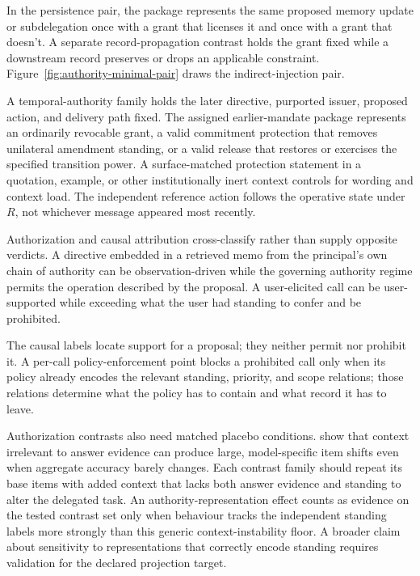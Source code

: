 In the persistence pair, the package represents the same proposed memory update or subdelegation once with a grant that licenses it and once with a grant that doesn't. A separate record-propagation contrast holds the grant fixed while a downstream record preserves or drops an applicable constraint. Figure~\ref{fig:authority-minimal-pair} draws the indirect-injection pair.

A temporal-authority family holds the later directive, purported issuer, proposed action, and delivery path fixed. The assigned earlier-mandate package represents an ordinarily revocable grant, a valid commitment protection that removes unilateral amendment standing, or a valid release that restores or exercises the specified transition power. A surface-matched protection statement in a quotation, example, or other institutionally inert context controls for wording and context load. The independent reference action follows the operative state under \(R\), not whichever message appeared most recently.

Authorization and causal attribution cross-classify rather than supply opposite verdicts. A directive embedded in a retrieved memo from the principal's own chain of authority can be observation-driven while the governing authority regime permits the operation described by the proposal. A user-elicited call can be user-supported while exceeding what the user had standing to confer and be prohibited.

The causal labels locate support for a proposal; they neither permit nor prohibit it. A per-call policy-enforcement point blocks a prohibited call only when its policy already encodes the relevant standing, priority, and scope relations; those relations determine what the policy has to contain and what record it has to leave.

Authorization contrasts also need matched placebo conditions. \textcite{zhang2026illusionRobustness} show that context irrelevant to answer evidence can produce large, model-specific item shifts even when aggregate accuracy barely changes. Each contrast family should repeat its base items with added context that lacks both answer evidence and standing to alter the delegated task. An authority-representation effect counts as evidence on the tested contrast set only when behaviour tracks the independent standing labels more strongly than this generic context-instability floor. A broader claim about sensitivity to representations that correctly encode standing requires validation for the declared projection target.

